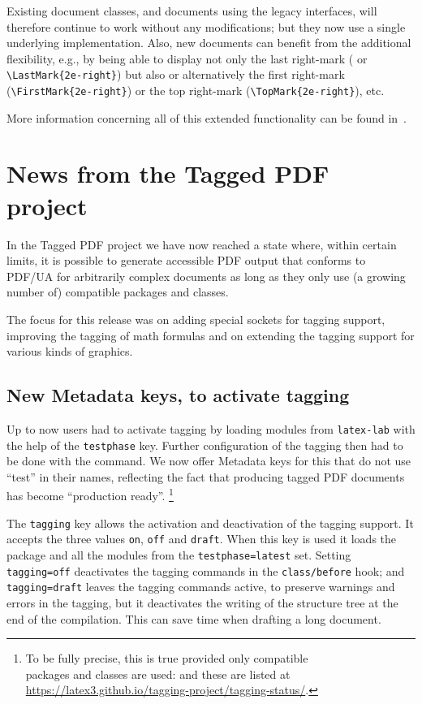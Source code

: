 \documentclass{ltnews}
\begin{document}
Existing document classes, and documents using the legacy interfaces,
will therefore continue to work without any modifications; but they
now use a single underlying implementation. Also, new documents can
benefit from the additional flexibility, e.g., by being able to
display not only the last right-mark ( or
\verb=\LastMark{2e-right}=) but also or alternatively the first
right-mark (\verb=\FirstMark{2e-right}=) or the top right-mark
(\verb=\TopMark{2e-right}=), etc.

More information concerning all of this extended functionality can be
found in~\cite{41:ltmarks}.


\section{News from the Tagged PDF project}

In the Tagged PDF project we have now reached a state where, within
certain limits, it is possible to generate accessible PDF output that
conforms to PDF/UA for arbitrarily complex documents as long as they
only use (a growing number of) compatible packages and classes.

The focus for this release was on adding special sockets for tagging
support, improving the tagging of math formulas and on extending the
tagging support for various kinds of graphics.

\subsection{New Metadata keys, to activate tagging}

Up to now users had to activate tagging by loading modules from
\texttt{latex-lab} with the help of the \texttt{testphase}
key. Further configuration of the tagging then had to be done with the
 command.  We now offer Metadata keys for this 
that do not use
\enquote{test} in their names, reflecting the fact that producing
tagged PDF documents has become \enquote{production ready}.%
\footnote{To be fully precise, this is true provided
only compatible\\
packages and classes are used: and these are listed at\\
\url{https://latex3.github.io/tagging-project/tagging-status/}.}

The \texttt{tagging} key allows the activation and deactivation of the tagging
support.  It accepts the three values \texttt{on}, \texttt{off} and
\texttt{draft}.  When this key is used it loads the
 package and all the modules from the
\texttt{testphase=latest} set.  Setting \texttt{tagging=off} deactivates the
tagging commands in the 
\texttt{class/before} hook; and \texttt{tagging=draft} leaves the 
tagging commands active, to 
preserve warnings and errors in the tagging, but it deactivates
the writing of the structure tree at the end of the compilation. This
can save time when drafting a long document.
\end{document}
